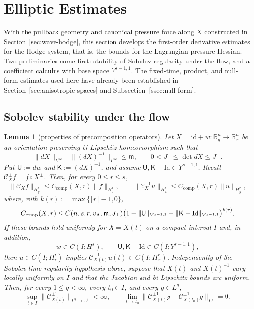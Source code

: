 \documentclass[11pt,reqno]{amsart}
\theoremstyle{plain}
\newtheorem{lemma}[theorem]{Lemma}
\theoremstyle{definition}
\theoremstyle{remark}
\numberwithin{equation}{section}
\newcommand{\Ufield}{\mathsf U}
\newcommand{\Kmat}{\mathsf K}
\newcommand{\Real}{\mathbb R}
\newcommand{\Rn}{\Real^n}
\begin{document}
\section{Elliptic Estimates}\label{sec:elliptic}

With the pullback geometry and canonical pressure force along $X$ constructed in
Section~\ref{sec:wave-hodge}, this section develops the first-order derivative
estimates for the Hodge system, that is, the bounds for the Lagrangian pressure
Hessian.  Two preliminaries come first: stability of Sobolev regularity under
the flow, and a coefficient calculus with base space $Y^{s-1,1}$.  The
fixed-time, product, and null-form estimates used here have already been
established in Section~\ref{sec:anisotropic-spaces} and
Subsection~\ref{ssec:null-form}.

\subsection{Sobolev stability under the flow}

\begin{lemma}[properties of precomposition operators]\label{lem:composition}
Let $X=\mathrm{id}+w:\Rn_y\to\Rn_x$ be an orientation-preserving
bi-Lipschitz homeomorphism such that
\[
 \|dX\|_{L^\infty}+\|(dX)^{-1}\|_{L^\infty}\le\mathfrak m,
 \qquad 0<J_-\le\det dX\le J_+.
\]
Put $\Ufield:=dw$ and $\Kmat:=(dX)^{-1}$, and assume
$\Ufield,\Kmat-\mathrm{Id}\in Y^{s-1,1}$.  Recall $\mathcal{C}_{X}^\pm f=f\circ X^\pm$. Then, for every $0\le r\le s$,
\begin{equation}\label{eq:sobolev-composition}
 \|\mathcal C_Xf\|_{H^r_y}\le C_{\mathrm{comp}}(X,r)\|f\|_{H^r_x},
 \qquad
 \|\mathcal C_X^{-1}u\|_{H^r_x}\le C_{\mathrm{comp}}(X,r)\|u\|_{H^r_y},
\end{equation}
where, with $k(r):=\max\{\lceil r\rceil-1,0\}$,
\[
 C_{\mathrm{comp}}(X,r)\le C(n,s,r,v_{\rm A},\mathfrak m,J_\pm)
 \big(1+\|\Ufield\|_{Y^{s-1,1}}
        +\|\Kmat-\mathrm{Id}\|_{Y^{s-1,1}}\big)^{k(r)}.
\]
If these bounds hold uniformly for $X=X(t)$ on a compact interval $I$ and, in addition,
\[
 w\in C(I;H^s),\qquad
 \Ufield,\Kmat-\mathrm{Id}\in C(I;Y^{s-1,1}),
\]
then $u\in C(I;H^r_y)$ implies
$\mathcal C_{X(t)}^{-1}u(t)\in C(I;H^r_x)$. Independently of the Sobolev
time-regularity hypothesis above, suppose that $X(t)$ and $X(t)^{-1}$ vary
locally uniformly on $I$ and that the Jacobian and bi-Lipschitz bounds are
uniform. Then, for every $1\le q<\infty$, every $t_0\in I$, and every
$g\in L^q$,
\begin{equation}\label{eq:composition-Lr-continuity}
 \sup_{t\in I}\|\mathcal C_{X(t)}^{\pm1}\|_{L^q\to L^q}<\infty,\qquad
 \lim_{t\to t_0}\|\mathcal C_{X(t)}^{\pm1}g
 -\mathcal C_{X(t_0)}^{\pm1}g\|_{L^q}=0.
\end{equation}
\end{lemma}
\end{document}
